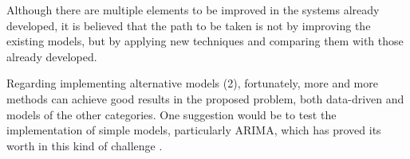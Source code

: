 Although there are multiple elements to be improved in the systems already developed, it is believed that the path to be taken is not by improving the existing models, but by applying new techniques and comparing them with those already developed. 

Regarding implementing alternative models (2), fortunately, more and more methods can achieve good results in the proposed problem, both data-driven and models of the other categories. One suggestion would be to test the implementation of simple models, particularly \ac{ARIMA}, which has proved its worth in this kind of challenge \cite{arimafuture}.